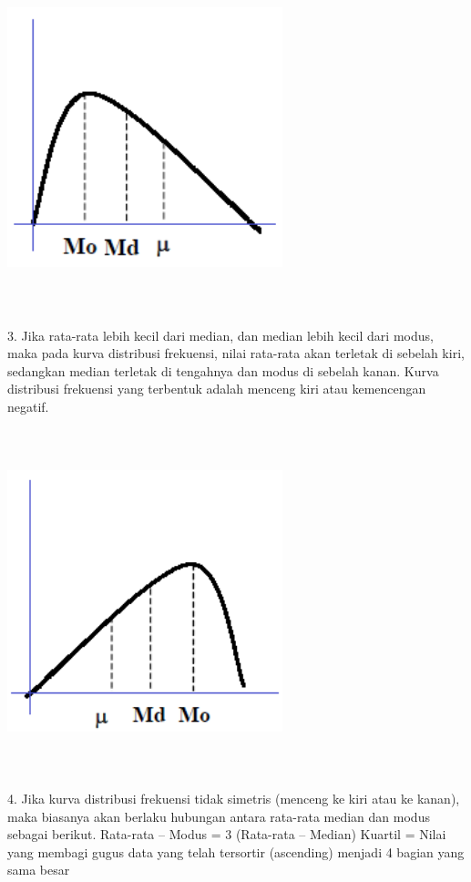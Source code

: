 \documentclass[11pt,fleqn]{book} %
\begin{document}
{\includegraphics[width = 8cm, height= 10cm]{Pictures/rizkie15.png}

3.	Jika rata-rata lebih kecil dari median, dan median lebih kecil dari modus, maka pada kurva distribusi frekuensi, nilai rata-rata akan terletak di sebelah kiri, sedangkan median terletak di tengahnya dan modus di sebelah kanan. Kurva distribusi frekuensi yang terbentuk adalah menceng kiri atau kemencengan negatif.

\includegraphics[width = 8cm, height= 10cm]{Pictures/rizkie16.png}

4.	Jika kurva distribusi frekuensi tidak simetris (menceng ke kiri atau ke kanan), maka biasanya akan berlaku hubungan antara rata-rata median dan modus sebagai berikut.
Rata-rata – Modus = 3 (Rata-rata – Median)
Kuartil =	Nilai yang membagi gugus data yang telah tersortir (ascending)
menjadi 4 bagian yang sama besar 

}
\end{document}
